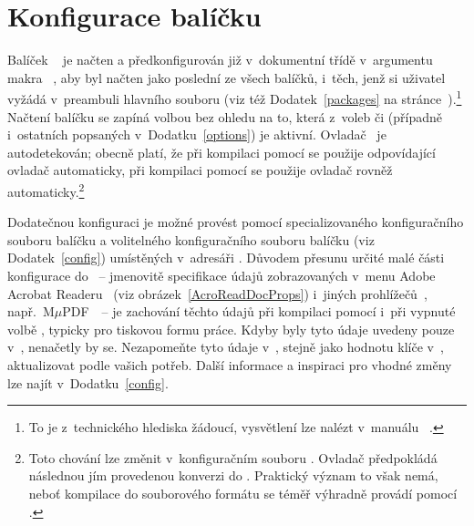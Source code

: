 
\chapter{Konfigurace balíčku }\label{hyconf}%

Balíček ~\cite{LtX:LIVE:CTAN:hyperref} je načten a
předkonfigurován již v~dokumentní třídě  v~argumentu makra
~\cite{Wri-Leh:LIVE:CTAN:etoolbox}, aby byl
načten jako poslední ze všech balíčků, i~těch, jenž si uživatel vyžádá
v~preambuli hlavního souboru (viz též Dodatek~\ref{packages} na
stránce~\pageref{pkghyperref}).\footnote{To je z~technického hlediska žádoucí,
  vysvětlení lze nalézt v~manuálu
  ~\cite{LtX:LIVE:CTAN:hyperref}.}  Načtení balíčku
 se zapíná volbou  bez ohledu na to, která z~voleb
 či  (případně i~ostatních popsaných
v~Dodatku~\ref{options}) je aktivní. Ovladač~\cite{SE:LIVE::DriversCreatePDF}
je autodetekován; obecně platí, že při kompilaci pomocí  se
použije odpovídající ovladač automaticky, při kompilaci pomocí  se
použije ovladač  rovněž automaticky.\footnote{Toto chování lze
  změnit v~konfiguračním souboru . Ovladač 
  předpokládá následnou jím provedenou konverzi do
  . Praktický význam to však nemá, neboť kompilace do
  souborového formátu  se téměř výhradně provádí pomocí
  .}

Dodatečnou konfiguraci je možné provést pomocí specializovaného konfiguračního
souboru  balíčku  a volitelného konfiguračního
souboru  balíčku \pkg{\ipotname} (viz
Dodatek~\ref{config}) umístěných v~adresáři . Důvodem přesunu
určité malé části konfigurace do ~-- jmenovitě specifikace
údajů zobrazovaných v~menu  Adobe Acrobat
Readeru~\cite{Adobe:LIVE::AcrobatReader} (viz obrázek~\ref{AcroReadDocProps})
i~jiných prohlížečů~,
např.~M$\mu$PDF~\cite{Art:LIVE::MuPDF}~-- je zachování těchto údajů při
kompilaci pomocí  i~při vypnuté volbě , typicky pro
tiskovou formu práce. Kdyby byly tyto údaje uvedeny pouze
v~, nenačetly by se. Nezapomeňte tyto údaje v~, stejně jako hodnotu klíče  v~,
aktualizovat podle vašich potřeb. Další informace a inspiraci pro vhodné změny
lze najít v~Dodatku~\ref{config}.

